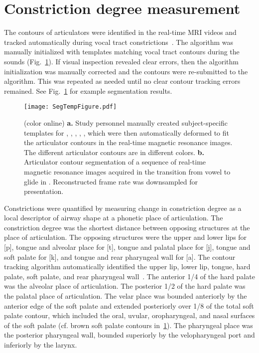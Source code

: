 \documentclass[preprint]{JASAnew}\usepackage[]{graphicx}\usepackage[]{color}
\begin{document}
\section{Constriction degree measurement}
\label{sec:cd}

The contours of articulators were identified in the real-time MRI videos and tracked automatically during vocal tract constrictions~\citep{bresch2009region}. The algorithm was manually initialized with templates matching vocal tract contours during the sounds \textipa{[a], [i], [p], [t], [k]} (Fig.~\ref{fig:segtemp}). 
%
If visual inspection revealed clear errors, then the algorithm initialization was manually corrected and the contours were re-submitted to the algorithm. This was repeated as needed until no clear contour tracking errors remained. 
%
See Fig.~\ref{fig:segtemp} for example segmentation results.

\begin{figure}

\texttt{[image: SegTempFigure.pdf]}

\caption{(color online) {\bf a.} Study personnel manually created subject-specific templates for \textipa{[a]}, \textipa{[i]}, \textipa{[p]}, \textipa{[t]}, \textipa{[k]}, which were then automatically deformed to fit the articulator contours in the real-time magnetic resonance images. The different articulator contours are in different colors.
{\bf b.} Articulator contour segmentation of a sequence of real-time magnetic resonance images acquired in the transition from vowel \textipa{[a]} to glide \textipa{[j]} in \textipa{[aja]}. Reconstructed frame rate was downsampled for presentation.}
\label{fig:segtemp}
\end{figure}



Constrictions were quantified by measuring change in constriction degree as a local descriptor of airway shape at a phonetic place of articulation. 
%
The constriction degree was the shortest distance between opposing structures at the place of articulation. 
%
The opposing structures were the upper and lower lips for [p], tongue and alveolar place for [t], tongue and palatal place for [j], tongue and soft palate for [k], and tongue and rear pharyngeal wall for [a]. 
%
The contour tracking algorithm automatically identified the upper lip, lower lip, tongue, hard palate, soft palate, and rear pharyngeal wall~\citep{bresch2009region}.  
%
The anterior \num{1/4} of the hard palate was the alveolar place of articulation. 
%
The posterior \num{1/2} of the hard palate was the palatal place of articulation.
%
The velar place was bounded anteriorly by the anterior edge of the soft palate and extended posteriorly over \num{1/8} of the total soft palate contour, which included the oral, uvular, oropharyngeal, and nasal surfaces of the soft palate (cf. brown soft palate contours in~\ref{fig:segtemp}).
%
The pharyngeal place was the posterior pharyngeal wall, bounded superiorly by the velopharyngeal port and inferiorly by the larynx. 
\end{document}
